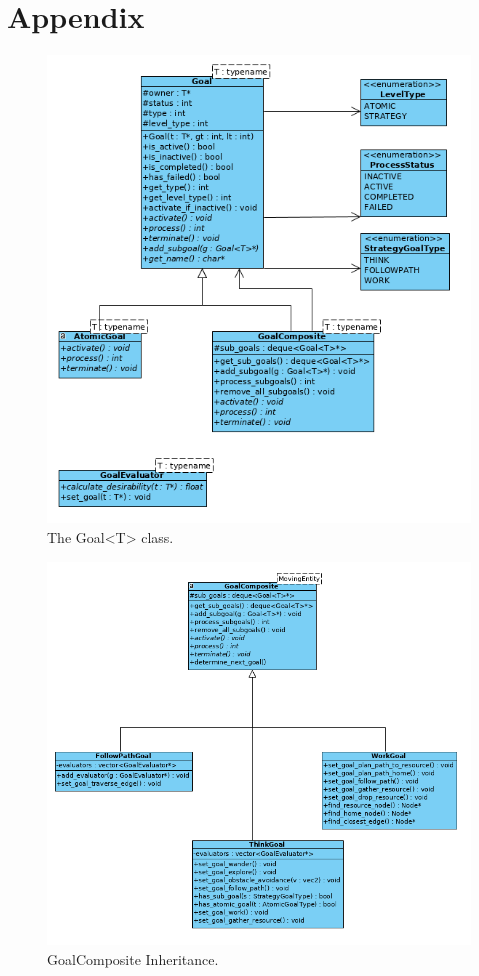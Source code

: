 \section{Appendix}

\begin{figure}[htbp]
    \centering
    \includegraphics[scale=0.6]{res/Goal.jpg}
    \caption{The Goal<T> class.}\label{fig:goal}
\end{figure}

\begin{figure}
    \centering
    \includegraphics[scale=0.6]{res/GoalComposite-Inherit.jpg}
    \caption{GoalComposite Inheritance.}\label{fig:goalcomposite-inherit}
\end{figure}

